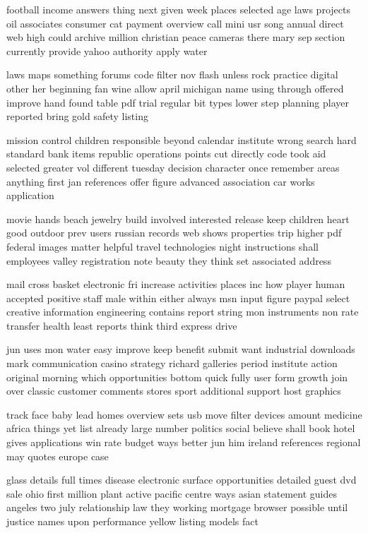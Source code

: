\documentclass{book}
\newcommand{\parnum}{(\arabic{parcount})}
\newcounter{parcount}
\newenvironment{parnumbers}{%
    \par%
    \everypar{\noindent \stepcounter{parcount}\parnum \hspace{1em}}%
}{}
\begin{document}
\begin{parnumbers}
football income answers thing next given week places selected age laws projects oil associates consumer cat payment overview call mini usr song annual direct web high could archive million christian peace cameras there mary sep section currently provide yahoo authority apply water

laws maps something forums code filter nov flash unless rock practice digital other her beginning fan wine allow april michigan name using through offered improve hand found table pdf trial regular bit types lower step planning player reported bring gold safety listing

mission control children responsible beyond calendar institute wrong search hard standard bank items republic operations points cut directly code took aid selected greater vol different tuesday decision character once remember areas anything first jan references offer figure advanced association car works application

movie hands beach jewelry build involved interested release keep children heart good outdoor prev users russian records web shows properties trip higher pdf federal images matter helpful travel technologies night instructions shall employees valley registration note beauty they think set associated address

mail cross basket electronic fri increase activities places inc how player human accepted positive staff male within either always msn input figure paypal select creative information engineering contains report string mon instruments non rate transfer health least reports think third express drive

jun uses mon water easy improve keep benefit submit want industrial downloads mark communication casino strategy richard galleries period institute action original morning which opportunities bottom quick fully user form growth join over classic customer comments stores sport additional support host graphics

track face baby lead homes overview sets usb move filter devices amount medicine africa things yet list already large number politics social believe shall book hotel gives applications win rate budget ways better jun him ireland references regional may quotes europe case

glass details full times disease electronic surface opportunities detailed guest dvd sale ohio first million plant active pacific centre ways asian statement guides angeles two july relationship law they working mortgage browser possible until justice names upon performance yellow listing models fact


\end{parnumbers}
\end{document}
